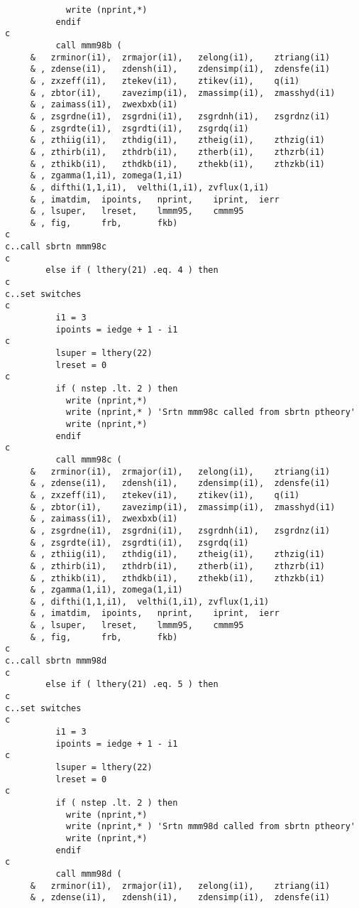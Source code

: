 \begin{verbatim}
            write (nprint,*)
          endif
c
          call mmm98b (
     &   zrminor(i1),  zrmajor(i1),   zelong(i1),    ztriang(i1)
     & , zdense(i1),   zdensh(i1),    zdensimp(i1),  zdensfe(i1)
     & , zxzeff(i1),   ztekev(i1),    ztikev(i1),    q(i1)
     & , zbtor(i1),    zavezimp(i1),  zmassimp(i1),  zmasshyd(i1)
     & , zaimass(i1),  zwexbxb(i1)
     & , zsgrdne(i1),  zsgrdni(i1),   zsgrdnh(i1),   zsgrdnz(i1)
     & , zsgrdte(i1),  zsgrdti(i1),   zsgrdq(i1)
     & , zthiig(i1),   zthdig(i1),    ztheig(i1),    zthzig(i1)
     & , zthirb(i1),   zthdrb(i1),    ztherb(i1),    zthzrb(i1)
     & , zthikb(i1),   zthdkb(i1),    zthekb(i1),    zthzkb(i1)
     & , zgamma(1,i1), zomega(1,i1)
     & , difthi(1,1,i1),  velthi(1,i1), zvflux(1,i1)
     & , imatdim,  ipoints,   nprint,    iprint,  ierr
     & , lsuper,   lreset,    lmmm95,    cmmm95
     & , fig,      frb,       fkb)
c
c..call sbrtn mmm98c
c
        else if ( lthery(21) .eq. 4 ) then
c
c..set switches
c
          i1 = 3
          ipoints = iedge + 1 - i1
c
          lsuper = lthery(22)
          lreset = 0
c
          if ( nstep .lt. 2 ) then
            write (nprint,*)
            write (nprint,* ) 'Srtn mmm98c called from sbrtn ptheory'
            write (nprint,*)
          endif
c
          call mmm98c (
     &   zrminor(i1),  zrmajor(i1),   zelong(i1),    ztriang(i1)
     & , zdense(i1),   zdensh(i1),    zdensimp(i1),  zdensfe(i1)
     & , zxzeff(i1),   ztekev(i1),    ztikev(i1),    q(i1)
     & , zbtor(i1),    zavezimp(i1),  zmassimp(i1),  zmasshyd(i1)
     & , zaimass(i1),  zwexbxb(i1)
     & , zsgrdne(i1),  zsgrdni(i1),   zsgrdnh(i1),   zsgrdnz(i1)
     & , zsgrdte(i1),  zsgrdti(i1),   zsgrdq(i1)
     & , zthiig(i1),   zthdig(i1),    ztheig(i1),    zthzig(i1)
     & , zthirb(i1),   zthdrb(i1),    ztherb(i1),    zthzrb(i1)
     & , zthikb(i1),   zthdkb(i1),    zthekb(i1),    zthzkb(i1)
     & , zgamma(1,i1), zomega(1,i1)
     & , difthi(1,1,i1),  velthi(1,i1), zvflux(1,i1)
     & , imatdim,  ipoints,   nprint,    iprint,  ierr
     & , lsuper,   lreset,    lmmm95,    cmmm95
     & , fig,      frb,       fkb)
c
c..call sbrtn mmm98d
c
        else if ( lthery(21) .eq. 5 ) then
c
c..set switches
c
          i1 = 3
          ipoints = iedge + 1 - i1
c
          lsuper = lthery(22)
          lreset = 0
c
          if ( nstep .lt. 2 ) then
            write (nprint,*)
            write (nprint,* ) 'Srtn mmm98d called from sbrtn ptheory'
            write (nprint,*)
          endif
c
          call mmm98d (
     &   zrminor(i1),  zrmajor(i1),   zelong(i1),    ztriang(i1)
     & , zdense(i1),   zdensh(i1),    zdensimp(i1),  zdensfe(i1)

\end{verbatim}
